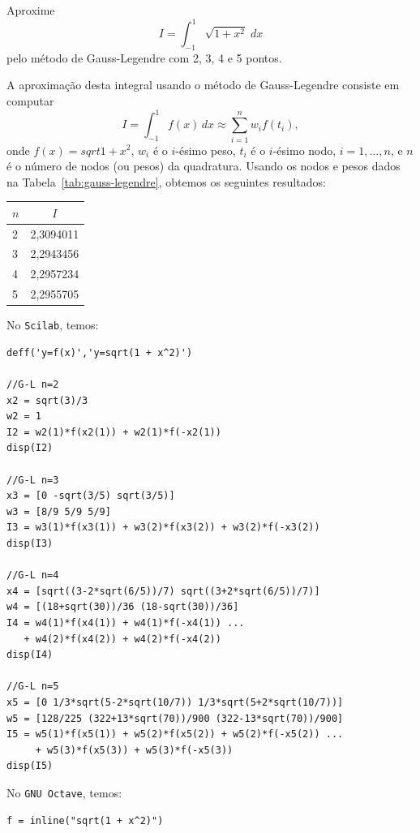 \begin{ex} Aproxime
  \begin{equation*}
    I = \int_{-1}^1\sqrt{1+x^2}\;dx
  \end{equation*}
pelo método de Gauss-Legendre com 2, 3, 4 e 5 pontos.
\end{ex}
\begin{sol}
  A aproximação desta integral usando o método de Gauss-Legendre consiste em computar
  \begin{equation*}
    I = \int_{-1}^1 f(x)\,dx \approx \sum_{i=1}^n w_if(t_i),
  \end{equation*}
onde $f(x) = sqrt{1 + x^2}$, $w_i$ é o $i$-ésimo peso, $t_i$ é o $i$-ésimo nodo, $i=1, \dotsc, n$, e $n$ é o número de nodos (ou pesos) da quadratura. Usando os nodos e pesos dados na Tabela~\ref{tab:gauss-legendre}, obtemos os seguintes resultados:
\begin{center}
  \begin{tabular}{l|c}
    $n$ & $I$ \\\hline
    2 & 2,3094011\\
    3 & 2,2943456\\
    4 & 2,2957234\\
    5 & 2,2955705\\\hline
  \end{tabular}
\end{center}

\ifisscilab
No \verb+Scilab+, temos:
\begin{verbatim}
deff('y=f(x)','y=sqrt(1 + x^2)')

//G-L n=2
x2 = sqrt(3)/3
w2 = 1
I2 = w2(1)*f(x2(1)) + w2(1)*f(-x2(1))
disp(I2)

//G-L n=3
x3 = [0 -sqrt(3/5) sqrt(3/5)]
w3 = [8/9 5/9 5/9]
I3 = w3(1)*f(x3(1)) + w3(2)*f(x3(2)) + w3(2)*f(-x3(2))
disp(I3)

//G-L n=4
x4 = [sqrt((3-2*sqrt(6/5))/7) sqrt((3+2*sqrt(6/5))/7)]
w4 = [(18+sqrt(30))/36 (18-sqrt(30))/36]
I4 = w4(1)*f(x4(1)) + w4(1)*f(-x4(1)) ...
   + w4(2)*f(x4(2)) + w4(2)*f(-x4(2))
disp(I4)

//G-L n=5
x5 = [0 1/3*sqrt(5-2*sqrt(10/7)) 1/3*sqrt(5+2*sqrt(10/7))]
w5 = [128/225 (322+13*sqrt(70))/900 (322-13*sqrt(70))/900]
I5 = w5(1)*f(x5(1)) + w5(2)*f(x5(2)) + w5(2)*f(-x5(2)) ...
     + w5(3)*f(x5(3)) + w5(3)*f(-x5(3))
disp(I5)
\end{verbatim}
\fi
\ifisoctave
No \verb+GNU Octave+, temos:
\begin{verbatim}
f = inline("sqrt(1 + x^2)")


\end{verbatim}
\end{sol}
